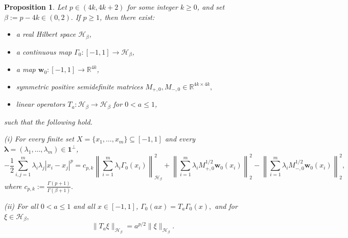 \documentclass[10pt,a4paper]{amsart}
\newtheorem{prop}{Proposition}
\begin{document}
\begin{prop}\label{prop:zero-anchored-exact-bridge-log}
Let $p\in(4k,4k+2)$ for some integer $k\geq 0$, and set
	\(
	\beta:=p-4k\in(0,2).
	\)
	If $p\geq 1$,
then there exist:
\begin{itemize}
\item a real Hilbert space $\mathcal H_\beta$,
\item a continuous map $\Gamma_0:[-1,1]\to \mathcal H_\beta$,
\item a map $\boldsymbol w_0:[-1,1]\to \mathbb R^{4k}$,
\item symmetric positive semidefinite matrices
\(
M_{+,0},M_{-,0}\in\mathbb R^{4k\times 4k},
\)
\item linear operators $T_a:\mathcal H_\beta\to\mathcal H_\beta$ for $0<a\le 1$,
\end{itemize}
such that the following hold.

\medskip
\noindent
\textnormal{(i)}
For every finite set $X=\{x_1,\dots,x_m\}\subseteq [-1,1]$ and every
$\boldsymbol\lambda=(\lambda_1,\dots,\lambda_m)\in \boldsymbol{1}^{\perp}$,
\[
-\frac12\sum_{i,j=1}^m \lambda_i\lambda_j |x_i-x_j|^p
=
c_{p,k}\left\|\sum_{i=1}^m \lambda_i\Gamma_0(x_i)\right\|_{\mathcal H_\beta}^2 +
\left\|\sum_{i=1}^m \lambda_i M_{+,0}^{1/2}\boldsymbol w_0(x_i)\right\|_2^2
-
\left\|\sum_{i=1}^m \lambda_i M_{-,0}^{1/2}\boldsymbol w_0(x_i)\right\|_2^2,
\]
where
\(
c_{p,k}:=\frac{\Gamma(p+1)}{\Gamma(\beta+1)}.
\)

\medskip
\noindent
\textnormal{(ii)}
For all $0<a\le 1$ and all $x\in[-1,1]$,
\(
\Gamma_0(ax)=T_a\Gamma_0(x),
\)
and for \(\xi\in\mathcal H_\beta,\)
\[
\|T_a\xi\|_{\mathcal H_\beta}=a^{p/2}\|\xi\|_{\mathcal H_\beta}.
\]
\end{prop}
\end{document}
